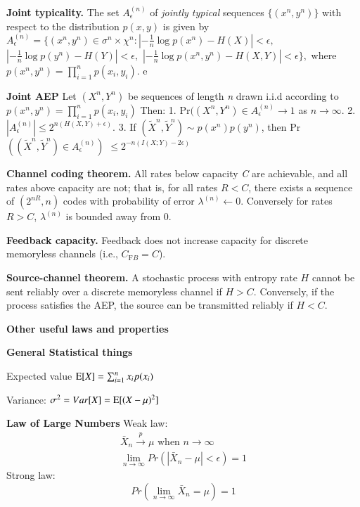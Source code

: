 \documentclass[10pt]{article}
\DeclareMathOperator*{\E}{\mbox{\text{E}}}
\begin{document}
\begin{tiny}
\begin{multicols}{3}
{\bf Joint typicality.}  The set $A_{\epsilon}^{(n)}$ of {\it jointly typical} sequences $\{(x^{n},y^{n})\}$ with respect to the distribution $p(x,y)$ is given by $A_{\epsilon}^{(n)} = \{ (x^{n},y^{n}) \in \sigma^{n} \times \chi^{n}: \left| -\frac{1}{n}\log p(x^{n}) - H(X) \right| < \epsilon, $ $\left| -\frac{1}{n}\log p(y^{n}) - H(Y) \right| <\epsilon, $ $\left| -\frac{1}{n} \log p(x^{n},y^{n})-H(X,Y) \right| <\epsilon \}, $ where $p(x^{n},y^{n}) = \prod_{i=1}^{n}p(x_{i},y_{i}).$
e


{\bf Joint AEP} Let $(X^{n}, Y^{n})$ be sequences of length {\it n} drawn i.i.d according to $p(x^{n},y^{n})=\prod_{i=1}^{n}p(x_{i},y_{i})$ Then: 
1. Pr$((X^{n},Y^{n}) \in A_{\epsilon}^{(n)}\rightarrow 1$ as $n\rightarrow \infty$. 
2. $|A_{\epsilon}^{(n)}|\leq 2^{n(H(X,Y)+\epsilon)}$. 
3. If $(\tilde{X}^{n}, \tilde{Y}^{n})\sim p(x^{n})p(y^{n})$, then Pr$( (\tilde{X}^{n},\tilde{Y}^{n})\in A_{\epsilon}^{(n)} ) $ $\leq 2^{-n(I(X;Y)-2\epsilon)}$

{\bf Channel coding theorem.} All rates below capacity {\it C} are achievable, and all rates above capacity are not; that is, for all rates $R<C$, there exists a sequence of $(2^{nR},n)$ codes with probability of error $\lambda^{(n)}\leftarrow 0$. Conversely for rates $R>C$, $\lambda^{(n)}$ is bounded away from 0.

{\bf Feedback capacity.} Feedback does not increase capacity for discrete memoryless channels (i.e., $C_{\text{F}B} = C$).

{\bf Source-channel theorem.} A stochastic process with entropy rate $H$ cannot be sent reliably over a discrete memoryless channel if $H > C$. Conversely, if the process satisfies the AEP, the source can be transmitted reliably if $H<C$.


\textbf{\scriptsize Other useful laws and properties}

{\bf General Statistical things} 

Expected value $\E[X]=\sum_{i=1}^n x_i p(x_i)$

Variance: $\sigma^2 = Var[X] = \E [ (X-\mu)^2]$

{\bf Law of Large Numbers} Weak law:
\begin{eqnarray*}
\bar{X}_n\overset{p}\rightarrow \mu \text{ when } n \rightarrow \infty\\
\lim_{n\rightarrow \infty} Pr\left(|\bar{X}_n-\mu| < \epsilon \right) = 1
\end{eqnarray*}
Strong law:
\begin{equation}
Pr\left(\lim_{n\rightarrow \infty} \bar{X}_n = \mu \right) = 1
\end{equation}


\end{multicols}
\end{tiny}
\end{document}
